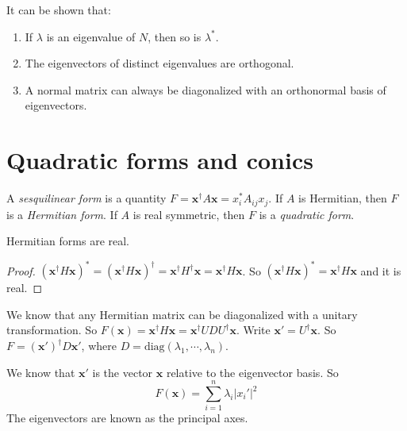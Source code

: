 \documentclass[a4paper]{article}
\begin{document}
      \begin{prop}
        It can be shown that:
        \begin{enumerate}
          \item If $\lambda$ is an eigenvalue of $N$, then so is $\lambda^*$.
          \item The eigenvectors of distinct eigenvalues are orthogonal.
          \item A normal matrix can always be diagonalized with an orthonormal basis of eigenvectors.
        \end{enumerate}
      \end{prop}

      \section{Quadratic forms and conics}
      \begin{defi}
        A \emph{sesquilinear form} is a quantity $F = \mathbf{x}^\dagger A\mathbf{x} = x_i^*A_{ij}x_j$. If $A$ is Hermitian, then $F$ is a \emph{Hermitian form}. If $A$ is real symmetric, then $F$ is a \emph{quadratic form}.
      \end{defi}

      \begin{thm}
        Hermitian forms are real.
      \end{thm}
      \begin{proof}
        $(\mathbf{x}^\dagger H\mathbf{x})^* = (\mathbf{x}^\dagger H\mathbf{x})^\dagger = \mathbf{x}^\dagger H^\dagger\mathbf{x} = \mathbf{x}^\dagger H\mathbf{x}$. So $(\mathbf{x}^\dagger H\mathbf{x})^* = \mathbf{x}^\dagger H\mathbf{x}$ and it is real.
      \end{proof}

      We know that any Hermitian matrix can be diagonalized with a unitary transformation. So $F(\mathbf{x}) = \mathbf{x}^\dagger H\mathbf{x} = \mathbf{x}^\dagger UDU^\dagger \mathbf{x}$. Write $\mathbf{x}' = U^\dagger \mathbf{x}$. So $F = (\mathbf{x}')^\dagger D\mathbf{x}'$, where $D = \mathrm{diag}(\lambda_1,\cdots,\lambda_n)$.

      We know that $\mathbf{x}'$ is the vector $\mathbf{x}$ relative to the eigenvector basis. So 
      \[
        F(\mathbf{x}) = \sum_{i = 1}^n \lambda_i |x_i'|^2
      \]
      The eigenvectors are known as the principal axes.
\end{document}

